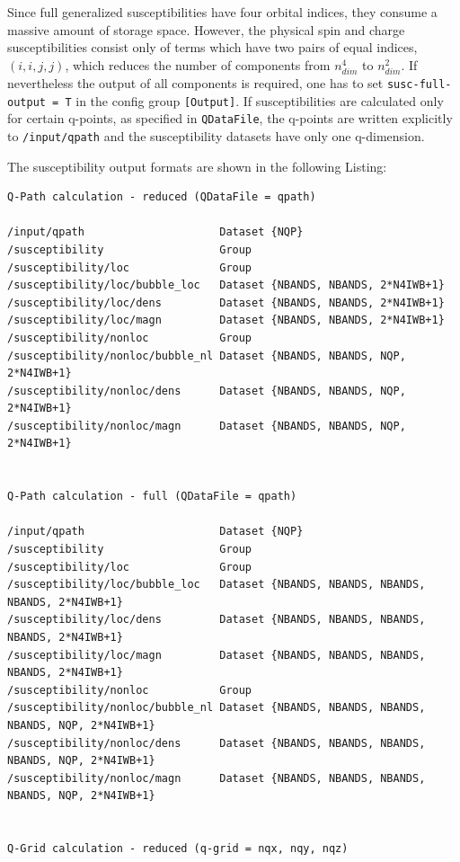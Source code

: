 \documentclass[a4paper,11pt]{article}
\numberwithin{equation}{section} %
\begin{document}
\newpage
Since full generalized susceptibilities have four orbital indices, they consume a massive amount of storage space. However, the physical spin and charge susceptibilities
consist only of terms which have two pairs of equal indices, $(i,i,j,j)$, which reduces the number of components from $n_{dim}^4$ to $n_{dim}^2$.
If nevertheless the output of all components is required,
one has to set \verb|susc-full-output = T| in the config group {\color{red}\verb|[Output]|}.
If susceptibilities are calculated only for certain q-points, as specified in \verb|QDataFile|, the q-points are
written explicitly to \verb|/input/qpath| and the susceptibility datasets have only one q-dimension.

The susceptibility output formats are shown in the following Listing:

\begin{lstlisting}[caption=susceptibility output comparison, frame=single, basicstyle=\scriptsize]
Q-Path calculation - reduced (QDataFile = qpath)

/input/qpath                     Dataset {NQP}
/susceptibility                  Group
/susceptibility/loc              Group
/susceptibility/loc/bubble_loc   Dataset {NBANDS, NBANDS, 2*N4IWB+1}
/susceptibility/loc/dens         Dataset {NBANDS, NBANDS, 2*N4IWB+1}
/susceptibility/loc/magn         Dataset {NBANDS, NBANDS, 2*N4IWB+1}
/susceptibility/nonloc           Group
/susceptibility/nonloc/bubble_nl Dataset {NBANDS, NBANDS, NQP, 2*N4IWB+1}
/susceptibility/nonloc/dens      Dataset {NBANDS, NBANDS, NQP, 2*N4IWB+1}
/susceptibility/nonloc/magn      Dataset {NBANDS, NBANDS, NQP, 2*N4IWB+1}


Q-Path calculation - full (QDataFile = qpath)

/input/qpath                     Dataset {NQP}
/susceptibility                  Group
/susceptibility/loc              Group
/susceptibility/loc/bubble_loc   Dataset {NBANDS, NBANDS, NBANDS, NBANDS, 2*N4IWB+1}
/susceptibility/loc/dens         Dataset {NBANDS, NBANDS, NBANDS, NBANDS, 2*N4IWB+1}
/susceptibility/loc/magn         Dataset {NBANDS, NBANDS, NBANDS, NBANDS, 2*N4IWB+1}
/susceptibility/nonloc           Group
/susceptibility/nonloc/bubble_nl Dataset {NBANDS, NBANDS, NBANDS, NBANDS, NQP, 2*N4IWB+1}
/susceptibility/nonloc/dens      Dataset {NBANDS, NBANDS, NBANDS, NBANDS, NQP, 2*N4IWB+1}
/susceptibility/nonloc/magn      Dataset {NBANDS, NBANDS, NBANDS, NBANDS, NQP, 2*N4IWB+1}


Q-Grid calculation - reduced (q-grid = nqx, nqy, nqz)


\end{lstlisting}
\end{document}

